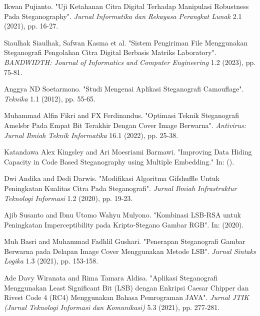 \documentclass{ittelkom}
\begin{document}
\newpage %
\begin{thebibliography}{99} %

    Ikwan Pujianto. "Uji Ketahanan Citra Digital Terhadap Manipulasi Robustness Pada Steganography". \textit{Jurnal Informatika dan Rekayasa Perangkat Lunak} 2.1 (2021), pp. 16-27.

    Siaulhak Siaulhak, Safwan Kasma et al. "Sistem Pengiriman File Menggunakan Steganografi Pengolahan Citra Digital Berbasis Matriks Laboratory". \textit{BANDWIDTH: Journal of Informatics and Computer Engineering} 1.2 (2023), pp. 75-81.

    Anggya ND Soetarmono. "Studi Mengenai Aplikasi Steganografi Camouflage". \textit{Teknika} 1.1 (2012), pp. 55-65.

    Muhammad Alfin Fikri and FX Ferdinandus. "Optimasi Teknik Steganografi Amelsbr Pada Empat Bit Terakhir Dengan Cover Image Berwarna". \textit{Antivirus: Jurnal Ilmiah Teknik Informatika} 16.1 (2022), pp. 25-38.

    Katandawa Alex Kingsley and Ari Moesriami Barmawi. "Improving Data Hiding Capacity in Code Based Steganography using Multiple Embedding." In: (). %

    Dwi Andika and Dedi Darwis. "Modifikasi Algoritma Gifshuffle Untuk Peningkatan Kualitas Citra Pada Steganografi". \textit{Jurnal Ilmiah Infrastruktur Teknologi Informasi} 1.2 (2020), pp. 19-23.

    Ajib Susanto and Ibnu Utomo Wahyu Mulyono. "Kombinasi LSB-RSA untuk Peningkatan Imperceptibility pada Kripto-Stegano Gambar RGB". In: (2020). %

    Muh Basri and Muhammad Fadhlil Gushari. "Penerapan Steganografi Gambar Berwarna pada Delapan Image Cover Menggunakan Metode LSB". \textit{Jurnal Sintaks Logika} 1.3 (2021), pp. 153-158.

    Ade Davy Wiranata and Rima Tamara Aldisa. "Aplikasi Steganografi Menggunakan Least Significant Bit (LSB) dengan Enkripsi Caesar Chipper dan Rivest Code 4 (RC4) Menggunakan Bahasa Pemrograman JAVA". \textit{Jurnal JTIK (Jurnal Teknologi Informasi dan Komunikasi)} 5.3 (2021), pp. 277-281.


\end{thebibliography}
\end{document}
